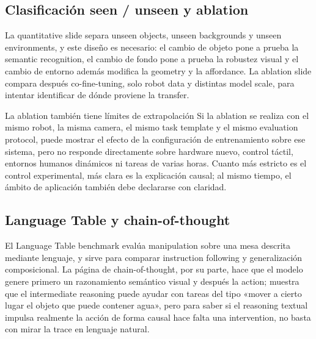 \subsection{Clasificación seen / unseen y ablation}

La quantitative slide separa unseen objects, unseen backgrounds y unseen environments, y este diseño es necesario: el cambio de objeto pone a prueba la semantic recognition, el cambio de fondo pone a prueba la robustez visual y el cambio de entorno además modifica la geometry y la affordance. La ablation slide compara después co-fine-tuning, solo robot data y distintas model scale, para intentar identificar de dónde proviene la transfer.



\begin{warningbox}{La ablation también tiene límites de extrapolación}
Si la ablation se realiza con el mismo robot, la misma camera, el mismo task template y el mismo evaluation protocol, puede mostrar el efecto de la configuración de entrenamiento sobre ese sistema, pero no responde directamente sobre hardware nuevo, control táctil, entornos humanos dinámicos ni tareas de varias horas. Cuanto más estricto es el control experimental, más clara es la explicación causal; al mismo tiempo, el ámbito de aplicación también debe declararse con claridad.
\end{warningbox}

\subsection{Language Table y chain-of-thought}

El Language Table benchmark evalúa manipulation sobre una mesa descrita mediante lenguaje, y sirve para comparar instruction following y generalización composicional. La página de chain-of-thought, por su parte, hace que el modelo genere primero un razonamiento semántico visual y después la action; muestra que el intermediate reasoning puede ayudar con tareas del tipo «mover a cierto lugar el objeto que puede contener agua», pero para saber si el reasoning textual impulsa realmente la acción de forma causal hace falta una intervention, no basta con mirar la trace en lenguaje natural.

